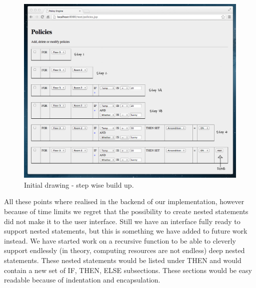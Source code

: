 \begin{figure}[ht]
\centering
\includegraphics[width=\columnwidth]{building_policy_steps.png}
\caption{Initial drawing - step wise build up.}
\label{fig:initialidea:policysteps}
\end{figure}

All these points where realised in the backend of our implementation, however because of time limits we regret that the possibility to create nested statements did not make it to the user interface. Still we have an interface fully ready to support nested statements, but this is something we have added to future work instead. We have started work on a recursive function to be able to cleverly support endlessly (in theory, computing resources are not endless) deep nested statements. These nested statements would be listed under THEN and would contain a new set of IF, THEN, ELSE subsections. These sections would be easy readable because of indentation and encapsulation.

